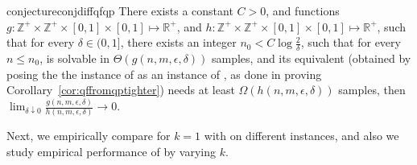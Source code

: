 \begin{restatable}{conjecture}{conjdiffqfqp}
There exists a constant $C > 0$, and functions $g: \mathbb{Z}^+ \times \mathbb{Z}^+ \times [0,1] \times [0,1] \mapsto \mathbb{R}^+$, and $h: \mathbb{Z}^+ \times \mathbb{Z}^+ \times [0,1] \times [0,1] \mapsto \mathbb{R}^+$,
such that for every $\delta \in (0, 1]$, there exists an integer $n_0 <  C\log\frac{2}{\delta}$, such that for
every $n\leq n_0$, \QF 
is solvable in $\Theta(g(n, m, \epsilon, \delta))$ samples, and its  equivalent \QP (obtained by posing the
the instance of \QF as an instance of \QP, as done in proving Corollary~\ref{cor:qffromqptighter}) needs at least  $\Omega(h(n, m, \epsilon, \delta))$ samples, then $\lim_{\delta \downarrow 0} \frac{g(n, m, \epsilon, \delta)}{h(n, m, \epsilon, \delta)} \to 0$.
\end{restatable}



 


Next, we empirically compare \GLUCB for 
$k=1$ with \FF on different instances, and also we study empirical performance of \GLUCB by varying $k$.
